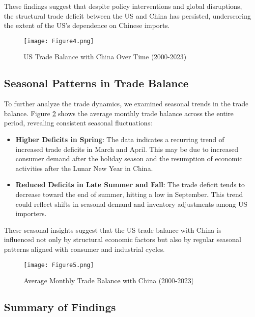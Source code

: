 \documentclass{article}
\begin{document}
These findings suggest that despite policy interventions and global disruptions, the structural trade deficit between the US and China has persisted, underscoring the extent of the US's dependence on Chinese imports.

\begin{figure}[H]
    \centering
    \texttt{[image: Figure4.png]}
    \caption{US Trade Balance with China Over Time (2000-2023)}
    \label{fig4}
\end{figure}

\subsection{Seasonal Patterns in Trade Balance}

To further analyze the trade dynamics, we examined seasonal trends in the trade balance. Figure \ref{fig5} shows the average monthly trade balance across the entire period, revealing consistent seasonal fluctuations:

\begin{itemize}
    \item \textbf{Higher Deficits in Spring}: The data indicates a recurring trend of increased trade deficits in March and April. This may be due to increased consumer demand after the holiday season and the resumption of economic activities after the Lunar New Year in China.
    \item \textbf{Reduced Deficits in Late Summer and Fall}: The trade deficit tends to decrease toward the end of summer, hitting a low in September. This trend could reflect shifts in seasonal demand and inventory adjustments among US importers.
\end{itemize}

These seasonal insights suggest that the US trade balance with China is influenced not only by structural economic factors but also by regular seasonal patterns aligned with consumer and industrial cycles.

\begin{figure}[H]
    \centering
    \texttt{[image: Figure5.png]}
    \caption{Average Monthly Trade Balance with China (2000-2023)}
    \label{fig5}
\end{figure}

\subsection{Summary of Findings}
\end{document}
